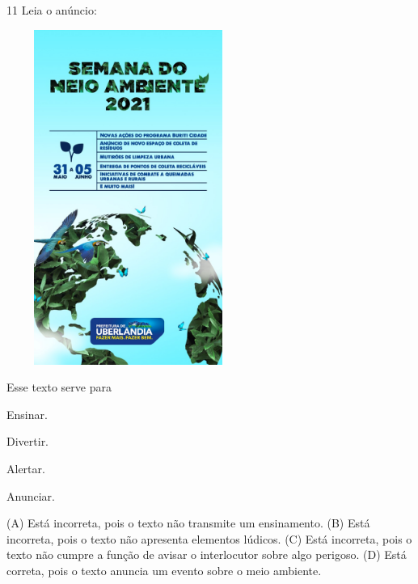 \num{11} Leia o anúncio:

\includegraphics[width=3.12674in,height=4.31210in]{media/image145.jpeg}


Esse texto serve para

\begin{minipage}{.5\textwidth}
\begin{escolha}
\item Ensinar.

\item Divertir.

\item Alertar.

\item Anunciar.
\end{escolha}
\end{minipage}

(A) Está incorreta, pois o texto não transmite um ensinamento.
(B) Está incorreta, pois o texto não apresenta elementos lúdicos.
(C) Está incorreta, pois o texto não cumpre a função de avisar o interlocutor sobre algo perigoso.
(D) Está correta, pois o texto anuncia um evento sobre o meio ambiente.

